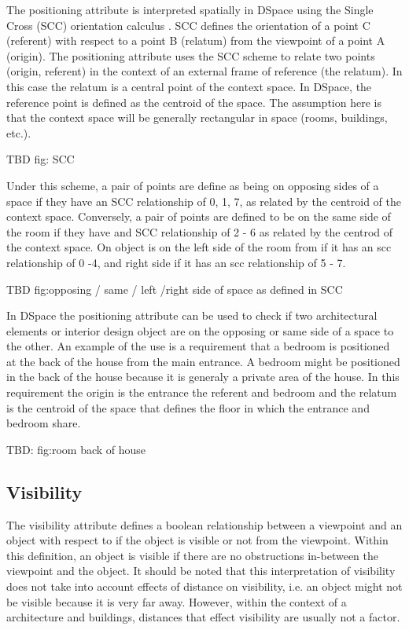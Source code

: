 \documentclass[12pt]{ucthesis}
\begin{document}
The positioning attribute is interpreted spatially in DSpace using the Single Cross (SCC) orientation calculus \cite{Freksa}. SCC defines the orientation of a point C (referent) with respect to a point B (relatum) from the viewpoint of a point A (origin). The positioning attribute uses the SCC scheme to relate two points (origin, referent) in the context of an external frame of reference (the relatum). In this case the relatum is a central point of the context space. In DSpace, the reference point is defined as the centroid of the space. The assumption here is that the context space will be generally rectangular in space (rooms, buildings, etc.).

TBD fig: SCC

Under this scheme, a pair of points are define as being on opposing sides of a space if they have an SCC relationship of 0, 1, 7, as related by the centroid of the context space. Conversely, a pair of points are defined to be on the same side of the room if they have and SCC relationship of 2 - 6 as related by the centrod of the context space. On object is on the left side of the room from if it has an scc relationship of 0 -4, and right side if it has an scc relationship of 5 - 7. 

TBD fig:opposing / same / left /right side of space as defined in SCC

In DSpace the positioning attribute can be used to check if two architectural elements or interior design object are on the opposing or same side of a space to the other. An example of the use is a requirement that a bedroom is positioned at the back of the house from the main entrance. A bedroom might be positioned in the back of the house because it is generaly a private area of the house. In this requirement the origin is the entrance the referent and bedroom and the relatum is the centroid of the space that defines the floor in which the entrance and bedroom share. 

TBD: fig:room back of house

\subsection{Visibility}
The visibility attribute defines a boolean relationship between a viewpoint and an object with respect to if the object is visible or not from the viewpoint. Within this definition, an object is visible if there are no obstructions in-between the viewpoint and the object. It should be noted that this interpretation of visibility does not take into account effects of distance on visibility, i.e. an object might not be visible because it is very far away. However, within the context of a architecture and buildings, distances that effect visibility are usually not a factor. 
\end{document}
